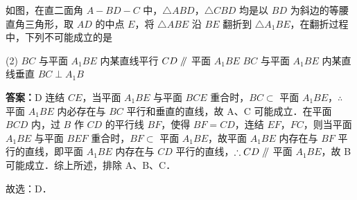 \vspace{2em}

\begin{example}[\bkstar{4}{5}]
如图，在直二面角 $A-BD-C$ 中，$\triangle ABD$，$\triangle CBD$ 均是以 $BD$ 为斜边的等腰直角三角形，取 $AD$ 的中点 $E$，将 $\triangle ABE$ 沿 $BE$ 翻折到 $\triangle A_1BE$，在翻折过程中，下列不可能成立的是
\begin{tasks}(2)
    \task $BC$ 与平面 $A_1BE$ 内某直线平行
    \task $CD\mathrel{/\mkern-5mu/}$ 平面 $A_1BE$
    \task $BC$ 与平面 $A_1BE$ 内某直线垂直
    \task $BC\perp A_1B$
\end{tasks}
\end{example}
\begin{solution}
\textbf{答案：}D
连结 $CE$，当平面 $A_1BE$ 与平面 $BCE$ 重合时，$BC\subset$ 平面 $A_1BE$，$\therefore$ 平面 $A_1BE$ 内必存在与 $BC$ 平行和垂直的直线，故 A、C 可能成立．在平面 $BCD$ 内，过 $B$ 作 $CD$ 的平行线 $BF$，使得 $BF=CD$，连结 $EF$，$FC$，则当平面 $A_1BE$ 与平面 $BEF$ 重合时，$BF\subset$ 平面 $A_1BE$，故平面 $A_1BE$ 内存在与 $BF$ 平行的直线，即平面 $A_1BE$ 内存在与 $CD$ 平行的直线，$\therefore CD\mathrel{/\mkern-5mu/}$ 平面 $A_1BE$，故 B 可能成立．综上所述，排除 A、B、C．

故选：D．
\end{solution}

\vspace{2em}
